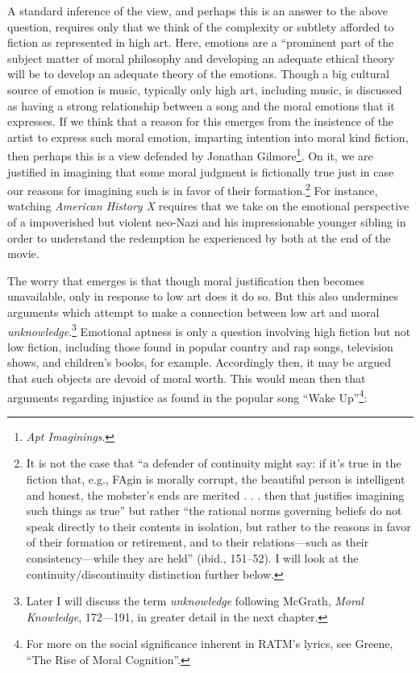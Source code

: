 \documentclass[phdthesis,12pt,final]{wuthesis}
\theoremstyle{definition}
\theoremstyle{definition}
\theoremstyle{definition}
\theoremstyle{definition}
\theoremstyle{remark}
\begin{document}
A standard inference of the view, and perhaps this is an answer to the above question, requires only that we think of the complexity or subtlety afforded to fiction as represented in high art. Here, emotions are a ``prominent part of the subject matter of moral philosophy and developing an adequate ethical theory will be to develop an adequate theory of the emotions. Though a big cultural source of emotion is music, typically only high art, including music, is discussed as having a strong relationship between a song and the moral emotions that it expresses. If we think that a reason for this emerges from the insistence of the artist to express such moral emotion, imparting intention into moral kind fiction, then perhaps this is a view defended by Jonathan Gilmore\footnote{\emph{Apt {Imaginings}}.}. On it, we are justified in imagining that some moral judgment is fictionally true just in case our reasons for imagining such is in favor of their formation.\footnote{It is not the case that ``a defender of continuity might say: if it's true in the fiction that, e.g., FAgin is morally corrupt, the beautiful person is intelligent and honest, the mobster's ends are merited . . . then that justifies imagining such things as true'' but rather ``the rational norms governing beliefs do not speak directly to their contents in isolation, but rather to the reasons in favor of their formation or retirement, and to their relations---such as their consistency---while they are held'' (ibid., 151--52). I will look at the continuity/discontinuity distinction further below.} For instance, watching \emph{American History X} requires that we take on the emotional perspective of a impoverished but violent neo-Nazi and his impressionable younger sibling in order to understand the redemption he experienced by both at the end of the movie.

The worry that emerges is that though moral justification then becomes unavailable, only in response to low art does it do so. But this also undermines arguments which attempt to make a connection between low art and moral \emph{unknowledge}.\footnote{Later I will discuss the term \emph{unknowledge} following McGrath, \emph{Moral {Knowledge}}, 172---191, in greater detail in the next chapter.} Emotional aptness is only a question involving high fiction but not low fiction, including those found in popular country and rap songs, television shows, and children's books, for example. Accordingly then, it may be argued that such objects are devoid of moral worth. This would mean then that arguments regarding injustice as found in the popular song ``Wake Up''\footnote{For more on the social significance inherent in RATM's lyrics, see Greene, {``The Rise of Moral Cognition''}.}:
\end{document}
